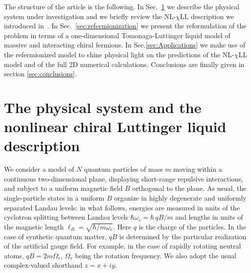 \documentclass[twocolumn,pra,superscriptaddress,noshowpacs]{revtex4}
\newcommand{\nlchill}{NL-$\chi$LL }
\begin{document}
The structure of the article is the following.
In Sec.~\ref{sec:physical_system} we describe the physical system under investigation and we briefly review the \nlchill description we introduced in~\cite{Nardin_PRA_2023}. In Sec.~\ref{sec:refermionization} we present the reformulation of the problem in terms of a one-dimensional Tomonaga-Luttinger liquid model of massive and interacting chiral fermions. In Sec.\ref{sec:Applications} we make use of the refermionized model to shine physical light on the predictions of the \nlchill model and of the full 2D numerical calculations.
Conclusions are finally given in section \ref{sec:conclusions}.

\section{The physical system and the nonlinear chiral Luttinger liquid description}\label{sec:physical_system}
We consider a model of $N$ quantum particles of mass $m$ moving within a continuous two-dimensional plane, displaying short-range repulsive interactions, and subject to a uniform magnetic field $B$ orthogonal to the plane.
As usual, the single-particle states in a uniform $B$ organize in highly degenerate and uniformly separated Landau levels: in what follows, energies are measured in units of the cyclotron splitting between Landau levels $\hbar\omega_c=\hbar\, qB/m$ and lengths  in units of the magnetic length $\ell_B=\sqrt{\hbar/m\omega_c}$. 
Here $q$ is the charge of the particles. In the case of synthetic quantum matter, $qB$ is determined by the particular realization of the artificial gauge field. For example, in the case of rapidly rotating neutral atoms\cite{Cooper_2008}, $qB=2m\Omega_r$, $\Omega_r$ being the rotation frequency.
We also adopt the usual complex-valued shorthand $z=x+iy$.
    
\end{document}
